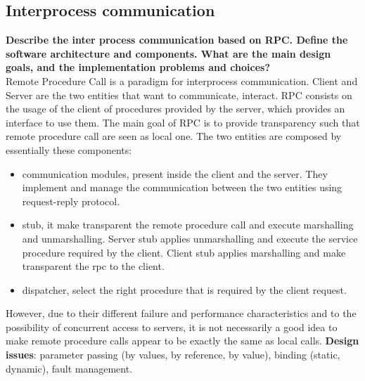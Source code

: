 \subsection{Interprocess communication}
\textbf{Describe the inter process communication based on RPC. Define the software architecture and components. What are the main design goals, and the implementation problems and choices?}\\
Remote Procedure Call is a paradigm for interprocess communication. Client and Server are the two entities that want to communicate, interact. RPC consists on the usage of the client of procedures provided by the server, which provides an interface to use them. The main goal of RPC is to provide transparency such that remote procedure call are seen as local one. The two entities are composed by essentially these components:
\begin{itemize}
	\item communication modules, present inside the client and the server. They implement and manage the communication between the two entities using request-reply protocol.
	\item stub, it make transparent the remote procedure call and execute marshalling and unmarshalling. Server stub applies unmarshalling and execute the service procedure required by the client. Client stub applies marshalling and make transparent the rpc to the client.
	\item dispatcher, select the right procedure that is required by the client request.
\end{itemize}
However, due to their different failure and performance characteristics and to the possibility of concurrent access to servers, it is not necessarily a good idea to make remote procedure calls appear to be exactly the same as local calls. \textbf{Design issues}: parameter passing (by values, by reference, by value), binding (static, dynamic), fault management.\\


